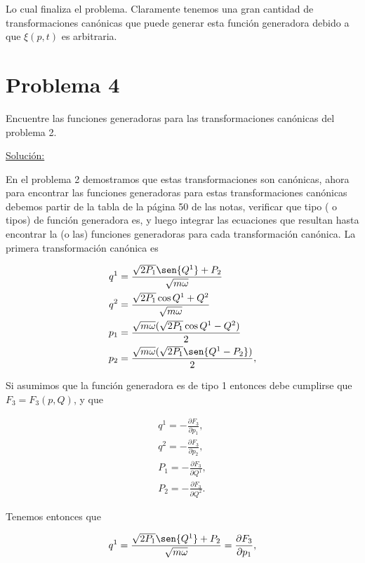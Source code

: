 \documentclass[a4paper,10pt]{article}
\numberwithin{equation}{section}
\begin{document}
Lo cual finaliza el problema. Claramente tenemos una gran cantidad de transformaciones 
canónicas que puede generar esta función generadora debido a que $\xi(p,t)$ es arbitraria.

\section{Problema 4}

Encuentre las funciones generadoras para las transformaciones canónicas del problema 
2.

\vspace{.3cm}

\underline{Solución:} \vspace{.3cm}

En el problema 2 demostramos que estas transformaciones son canónicas, ahora para 
encontrar las funciones generadoras para estas transformaciones canónicas debemos 
partir de la tabla de la página 50 de las notas, verificar que tipo ( o tipos) de 
función generadora es, y luego integrar las ecuaciones que resultan hasta encontrar
la (o las) funciones generadoras para cada transformación canónica. La primera 
transformación canónica es 

\begin{align*}
 q^1 &= \frac{\sqrt{2P_1}\sen{Q^1}+P_2}{\sqrt{m\omega}} \\
 q^2 &= \frac{\sqrt{2P_1}\cos{Q^1}+Q^2}{\sqrt{m\omega}} \\
 p_1 &= \frac{\sqrt{m\omega}(\sqrt{2P_1}\cos{Q^1 - Q^2})}{2} \\
 p_2 &= \frac{\sqrt{m\omega}(\sqrt{2P_1}\sen{Q^1 - P_2})}{2}, 
\end{align*}



Si asumimos que la función generadora es de tipo 1 entonces debe cumplirse que 
$F_3 = F_3(p,Q)$, y que 

\begin{align*}
 q^1 = - \frac{\partial F_3}{\partial p_1}, \\
 q^2 = - \frac{\partial F_3}{\partial p_2}, \\
 P_1 = - \frac{\partial F_3}{\partial Q^1}, \\
 P_2 = - \frac{\partial F_3}{\partial Q^2}.
\end{align*}

Tenemos entonces que 

\begin{equation}
 q^1 = \frac{\sqrt{2P_1}\sen{Q^1}+P_2}{\sqrt{m\omega}} = 
 \frac{\partial F_3}{\partial p_1},
\end{equation}
\end{document}
